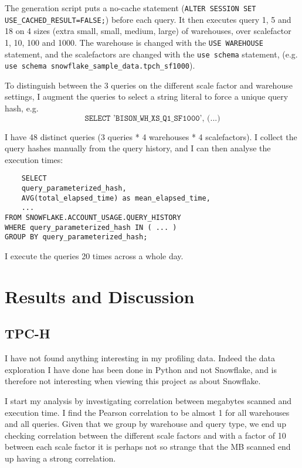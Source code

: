 \documentclass{article}
\begin{document}
\medskip \noindent The generation script puts a no-cache statement (\texttt{ALTER SESSION SET USE\_CACHED\_RESULT=FALSE;}) before each query. It then executes query 1, 5 and 18 on 4 sizes (extra small, small, medium, large) of warehouses, over scalefactor 1, 10, 100 and 1000. The warehouse is changed with the \texttt{USE WAREHOUSE} statement, and the scalefactors are changed with the \texttt{use schema} statement, (e.g. \texttt{use schema snowflake\_sample\_data.tpch\_sf1000}).

\medskip \noindent To distinguish between the 3 queries on the different scale factor and warehouse settings, I augment the queries to select a string literal to force a unique query hash, e.g. $$ \texttt{SELECT 'BISON\_WH\_XS\_Q1\_SF1000', (...)} $$

\medskip \noindent I have 48 distinct queries (3 queries * 4 warehouses * 4 scalefactors). I collect the query hashes manually from the query history, and I can then analyse the execution times:

\begin{verbatim}
    SELECT 
    query_parameterized_hash,
    AVG(total_elapsed_time) as mean_elapsed_time,
    ... 
FROM SNOWFLAKE.ACCOUNT_USAGE.QUERY_HISTORY
WHERE query_parameterized_hash IN ( ... )
GROUP BY query_parameterized_hash;
\end{verbatim}

\noindent I execute the queries 20 times across a whole day. 

\section{Results and Discussion}

\FloatBarrier

\subsection{TPC-H}

I have not found anything interesting in my profiling data. Indeed the data exploration I have done has been done in Python and not Snowflake, and is therefore not interesting when viewing this project as about Snowflake. 

\medskip \noindent I start my analysis by investigating correlation between megabytes scanned and execution time. I find the Pearson correlation to be almost 1 for all warehouses and all queries. Given that we group by warehouse and query type, we end up checking correlation between the different scale factors and with a factor of 10 between each scale factor it is perhaps not so strange that the MB scanned end up having a strong correlation. 
\end{document}

